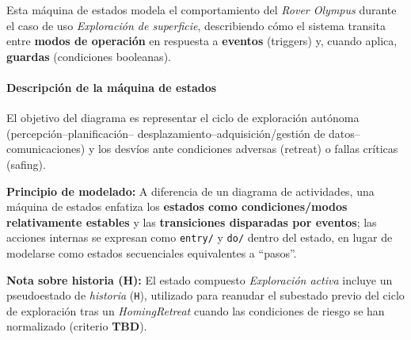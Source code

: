 Esta máquina de estados modela el comportamiento del \textit{Rover Olympus} durante el caso de uso \textit{Exploración de superficie}, describiendo cómo el sistema transita entre \textbf{modos de operación} en respuesta a \textbf{eventos} (triggers) y, cuando aplica, \textbf{guardas} (condiciones booleanas). \cite{UMLStateMachinesConcepts1,UMLStateMachinesConcepts2}

\paragraph{Descripción de la máquina de estados}\label{para:uc01_states_desc}
\begin{sloppypar}
El objetivo del diagrama es representar el ciclo de exploración autónoma
(percepción\allowbreak --\allowbreak planificación\allowbreak --\allowbreak
desplazamiento\allowbreak --\allowbreak adquisición/\allowbreak gestión de
datos\allowbreak --\allowbreak comunicaciones) y los desvíos ante condiciones
adversas (retreat) o fallas críticas (safing).
\cite{UMLStateMachinesConcepts1,UMLStateMachinesConcepts2}
\end{sloppypar}

\textbf{Principio de modelado:}
A diferencia de un diagrama de actividades, una máquina de estados enfatiza los \textbf{estados como condiciones/modos relativamente estables} y las \textbf{transiciones disparadas por eventos}; las acciones internas se expresan como \texttt{entry/} y \texttt{do/} dentro del estado, en lugar de modelarse como estados secuenciales equivalentes a “pasos”. \cite{UMLStateMachinesConcepts1,UMLStateMachinesConcepts2}

\textbf{Nota sobre historia (H):}
El estado compuesto \textit{Exploración activa} incluye un pseudoestado de \textit{historia} (\texttt{H}), utilizado para reanudar el subestado previo del ciclo de exploración tras un \textit{HomingRetreat} cuando las condiciones de riesgo se han normalizado (criterio \textbf{TBD}). \cite{UMLStateMachinesConcepts2}

